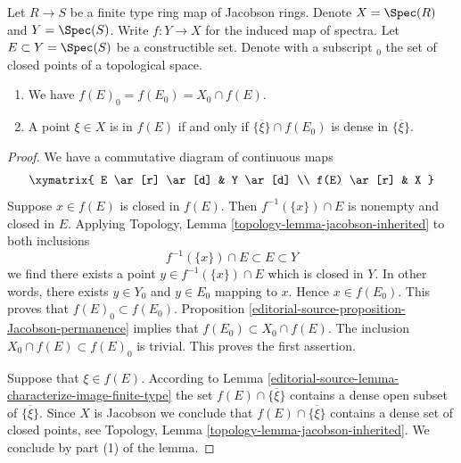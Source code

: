 \begin{lemma}
\label{editorial-source-lemma-image-finite-type-map-Jacobson-rings}
Let $R \to S$ be a finite type ring map of Jacobson rings.
Denote $X = \Spec(R)$ and $Y = \Spec(S)$.
Write $f : Y \to X$ for the induced
map of spectra. Let $E \subset Y = \Spec(S)$ be a
constructible set. Denote with a subscript ${}_0$ the set
of closed points of a topological space.
\begin{enumerate}
\item We have $f(E)_0 = f(E_0) = X_0 \cap f(E)$.
\item A point $\xi \in X$ is in $f(E)$ if and only if
$\overline{\{\xi\}} \cap f(E_0)$ is dense in $\overline{\{\xi\}}$.
\end{enumerate}
\end{lemma}

\begin{proof}
We have a commutative diagram of continuous maps
$$
\xymatrix{
E \ar[r] \ar[d] & Y \ar[d] \\
f(E) \ar[r] & X
}
$$
Suppose $x \in f(E)$ is closed in $f(E)$. Then $f^{-1}(\{x\})\cap E$
is nonempty and closed in $E$. Applying
Topology, Lemma \ref{topology-lemma-jacobson-inherited}
to both inclusions
$$
f^{-1}(\{x\}) \cap E \subset E \subset Y
$$
we find there exists a point $y \in f^{-1}(\{x\}) \cap E$ which is
closed in $Y$. In other words, there exists $y \in Y_0$ and $y \in E_0$
mapping to $x$. Hence $x \in f(E_0)$.
This proves that $f(E)_0 \subset f(E_0)$.
Proposition \ref{editorial-source-proposition-Jacobson-permanence} implies that
$f(E_0) \subset X_0 \cap f(E)$. The inclusion
$X_0 \cap f(E) \subset f(E)_0$ is trivial. This proves the
first assertion.

\medskip\noindent
Suppose that $\xi \in f(E)$. According to
Lemma \ref{editorial-source-lemma-characterize-image-finite-type}
the set $f(E) \cap \overline{\{\xi\}}$ contains a dense
open subset of $\overline{\{\xi\}}$. Since $X$ is Jacobson
we conclude that $f(E) \cap \overline{\{\xi\}}$ contains a
dense set of closed points, see Topology,
Lemma \ref{topology-lemma-jacobson-inherited}.
We conclude by part (1) of the lemma.


\end{proof}

